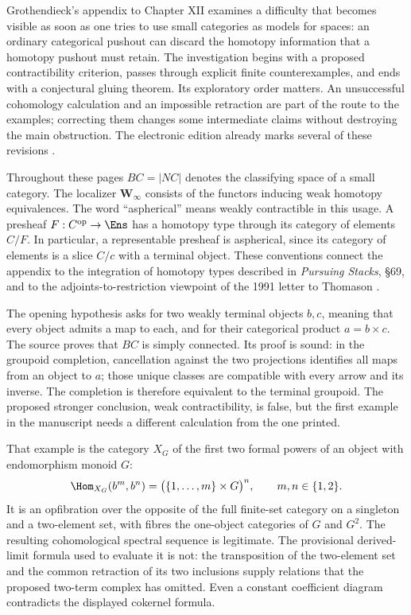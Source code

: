 Grothendieck's appendix to Chapter XII examines a difficulty that becomes visible as soon as one tries to use small categories as models for spaces: an ordinary categorical pushout can discard the homotopy information that a homotopy pushout must retain. The investigation begins with a proposed contractibility criterion, passes through explicit finite counterexamples, and ends with a conjectural gluing theorem. Its exploratory order matters. An unsuccessful cohomology calculation and an impossible retraction are part of the route to the examples; correcting them changes some intermediate claims without destroying the main obstruction. The electronic edition already marks several of these revisions \citep{Grothendieck1990XIIapp}.

Throughout these pages \(BC=|NC|\) denotes the classifying space of a small category. The localizer \(\mathbf W_\infty\) consists of the functors inducing weak homotopy equivalences. The word ``aspherical'' means weakly contractible in this usage. A presheaf \(F:C^{\mathrm{op}}\to\Ens\) has a homotopy type through its category of elements \(C/F\). In particular, a representable presheaf is aspherical, since its category of elements is a slice \(C/c\) with a terminal object. These conventions connect the appendix to the integration of homotopy types described in \emph{Pursuing Stacks}, \S69, and to the adjoints-to-restriction viewpoint of the 1991 letter to Thomason \citep{Grothendieck1983,Grothendieck1991Letter}.

The opening hypothesis asks for two weakly terminal objects \(b,c\), meaning that every object admits a map to each, and for their categorical product \(a=b\times c\). The source proves that \(BC\) is simply connected. Its proof is sound: in the groupoid completion, cancellation against the two projections identifies all maps from an object to \(a\); those unique classes are compatible with every arrow and its inverse. The completion is therefore equivalent to the terminal groupoid. The proposed stronger conclusion, weak contractibility, is false, but the first example in the manuscript needs a different calculation from the one printed.

That example is the category \(X_G\) of the first two formal powers of an object with endomorphism monoid \(G\):
\[
 \Hom_{X_G}(b^m,b^n)=\bigl(\{1,\ldots,m\}\times G\bigr)^n,
 \qquad m,n\in\{1,2\}.
\]
It is an opfibration over the opposite of the full finite-set category on a singleton and a two-element set, with fibres the one-object categories of \(G\) and \(G^2\). The resulting cohomological spectral sequence is legitimate. The provisional derived-limit formula used to evaluate it is not: the transposition of the two-element set and the common retraction of its two inclusions supply relations that the proposed two-term complex has omitted. Even a constant coefficient diagram contradicts the displayed cokernel formula.

